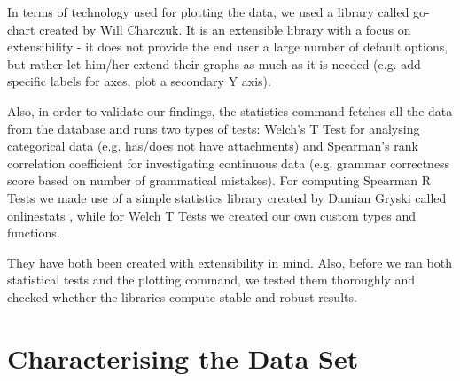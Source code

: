 \documentclass{mpaper}
\begin{document}
In terms of technology used for plotting the data, we used a library called go-chart \cite{go-chart} created by 
Will Charczuk. It is an extensible library with a focus on extensibility - it does not provide the end user a large number 
of default options, but rather let him/her extend their graphs as much as it is needed (e.g. add specific labels for axes, 
plot a secondary Y axis).

Also, in order to validate our findings, the statistics command fetches all the data from the database and runs two types of 
tests: Welch's T Test \cite{welch1947generalization} for analysing categorical data (e.g. has/does not have attachments)
and Spearman's rank correlation coefficient \cite{spearman1904proof} for investigating continuous data (e.g. grammar correctness score 
based on number of grammatical mistakes). For computing Spearman R Tests we made use of a simple 
statistics library created by Damian Gryski called onlinestats \cite{onlinestats}, while for Welch T Tests we created our 
own custom types and functions. 

They have both been created with extensibility in mind. Also, before
we ran both statistical tests and the plotting command, we tested them thoroughly and checked whether the libraries compute 
stable and robust results.

\section{Characterising the Data Set}\label{characterising}
\end{document}
